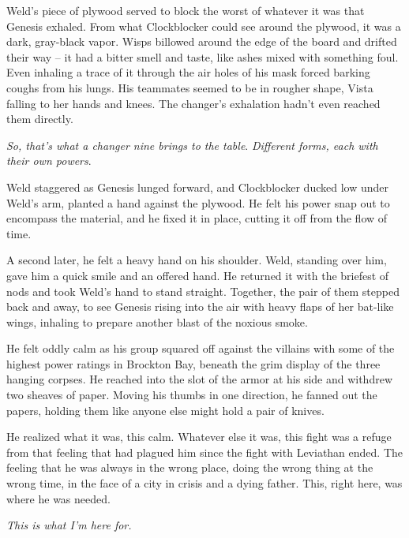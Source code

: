 Weld's piece of plywood served to block the worst of whatever it was that Genesis exhaled.  From what Clockblocker could see around the plywood, it was a dark, gray-black vapor.  Wisps billowed around the edge of the board and drifted their way – it had a bitter smell and taste, like ashes mixed with something foul.  Even inhaling a trace of it through the air holes of his mask forced barking coughs from his lungs.  His teammates seemed to be in rougher shape, Vista falling to her hands and knees.  The changer's exhalation hadn't even reached them directly.



\emph{So, that's what a changer nine brings to the table}.  \emph{Different forms, each with their own powers}.



Weld staggered as Genesis lunged forward, and Clockblocker ducked low under Weld's arm, planted a hand against the plywood.  He felt his power snap out to encompass the material, and he fixed it in place, cutting it off from the flow of time.



A second later, he felt a heavy hand on his shoulder.  Weld, standing over him, gave him a quick smile and an offered hand.  He returned it with the briefest of nods and took Weld's hand to stand straight.  Together, the pair of them stepped back and away, to see Genesis rising into the air with heavy flaps of her bat-like wings, inhaling to prepare another blast of the noxious smoke.



He felt\emph{ }oddly calm as his group squared off against the villains with some of the highest power ratings in Brockton Bay, beneath the grim display of the three hanging corpses.  He reached into the slot of the armor at his side and withdrew two sheaves of paper.  Moving his thumbs in one direction, he fanned out the papers, holding them like anyone else might hold a pair of knives.



He realized what it was, this calm.  Whatever else it was, this fight was a refuge from that feeling that had plagued him since the fight with Leviathan ended.  The feeling that he was always in the wrong place, doing the wrong thing at the wrong time, in the face of a city in crisis and a dying father.  This, right here, was where he was needed.  


\emph{This is what I'm here for.}

